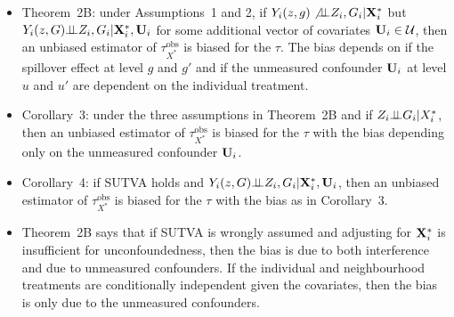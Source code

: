\documentclass[10pt]{article}
\begin{document}
\begin{itemize}

\item
Theorem~2B: under Assumptions~1 and 2, if $Y_i(z,g)\not{\perp\!\!\!\perp} Z_i,G_i|\mathbf{X}_i^*$ but $Y_i(z,G){\perp\!\!\!\perp} Z_i,G_i|\mathbf{X}_i^*,\mathbf{U}_i$ for some additional vector of covariates $\mathbf{U}_i\in\mathcal{U}$, then an unbiased estimator of $\tau_{X^*}^\text{obs}$ is biased for the $\tau$. The bias depends on if the spillover effect at level $g$ and $g'$ and if the unmeasured confounder $\mathbf{U}_i$ at level $u$ and $u'$ are dependent on the individual treatment.

\item
Corollary~3: under the three assumptions in Theorem~2B and if $Z_i{\perp\!\!\!\perp} G_i|X_i^*$, then an unbiased estimator of $\tau_{X^*}^\text{obs}$ is biased for the $\tau$ with the bias depending only on the unmeasured confounder $\mathbf{U}_i$.

\item
Corollary~4: if SUTVA holds and $Y_i(z,G){\perp\!\!\!\perp} Z_i,G_i|\mathbf{X}_i^*,\mathbf{U}_i$, then an unbiased estimator of $\tau_{X^*}^\text{obs}$ is biased for the $\tau$ with the bias as in Corollary~3.

\item
Theorem~2B says that if SUTVA is wrongly assumed and adjusting for $\mathbf{X}_i^*$ is insufficient for unconfoundedness, then the bias is due to both interference and due to unmeasured confounders. If the individual and neighbourhood treatments are conditionally independent given the covariates, then the bias is only due to the unmeasured confounders.

\end{itemize}


\newpage

\printbibliography
\end{document}
